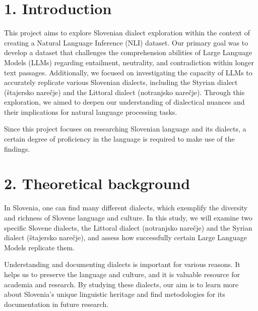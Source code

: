 \documentclass[fleqn,moreauthors,10pt]{ds_report}
\affiliation{\textit{Advisors: Aleš Žagar}}
\begin{document}
\flushbottom 

\maketitle 

\thispagestyle{empty} 


\section*{1. Introduction}

    This project aims to explore Slovenian dialect exploration within the context of creating a Natural Language Inference (NLI) dataset. Our primary goal was to develop a dataset that challenges the comprehension abilities of Large Language Models (LLMs) regarding entailment, neutrality, and contradiction within longer text passages. Additionally, we focused on investigating the capacity of LLMs to accurately replicate various Slovenian dialects, including the Styrian dialect (štajersko narečje) and the Littoral dialect (notranjsko narečje). Through this exploration, we aimed to deepen our understanding of dialectical nuances and their implications for natural language processing tasks.

    Since this project focuses on researching Slovenian language and its dialects, a certain degree of proficiency in the language is required to make use of the findings.


\section{ 2. Theoretical background}

    In Slovenia, one can find many different dialects, which exemplify the diversity and richness of  Slovene language and culture. In this study, we will examine two specific Slovene dialects, the Littoral dialect (notranjsko narečje) and the Syrian dialect (štajersko narečje), and assess how successfully certain Large Language Models replicate them.
    
    Understanding and documenting dialects is important for various reasons. It helps us to preserve the language and culture, and it is valuable resource for academia and research. By studying these dialects, our aim is to learn more about Slovenia's unique linguistic heritage and find metodologies for its  documentation in future research. 
\end{document}
